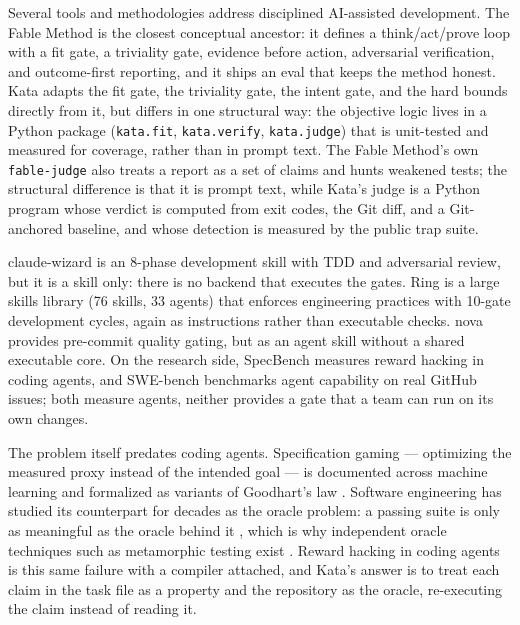 \documentclass[11pt]{article}
\begin{document}
Several tools and methodologies address disciplined AI-assisted development.
The Fable Method \cite{fable} is the closest conceptual ancestor: it defines
a think/act/prove loop with a fit gate, a triviality gate, evidence before
action, adversarial verification, and outcome-first reporting, and it ships
an eval that keeps the method honest. Kata adapts the fit gate, the
triviality gate, the intent gate, and the hard bounds directly from it, but
differs in one structural way: the objective logic lives in a Python package
(\texttt{kata.fit}, \texttt{kata.verify}, \texttt{kata.judge}) that is
unit-tested and measured for coverage, rather than in prompt text. The
Fable Method's own \texttt{fable-judge} also treats a report as a set of
claims and hunts weakened tests; the structural difference is that it is
prompt text, while Kata's judge is a Python program whose verdict is
computed from exit codes, the Git diff, and a Git-anchored baseline, and
whose detection is measured by the public trap suite.

claude-wizard \cite{claudewizard} is an 8-phase development skill with TDD
and adversarial review, but it is a skill only: there is no backend that
executes the gates. Ring \cite{ring} is a large skills library (76 skills, 33
agents) that enforces engineering practices with 10-gate development cycles,
again as instructions rather than executable checks. nova \cite{nova}
provides pre-commit quality gating, but as an agent skill without a shared
executable core. On the research
side, SpecBench \cite{specbench} measures reward hacking in coding agents, and
SWE-bench \cite{swebench} benchmarks agent capability on real GitHub issues;
both measure agents, neither provides a gate that a team can run on its own
changes.

The problem itself predates coding agents. Specification gaming ---
optimizing the measured proxy instead of the intended goal --- is
documented across machine learning \cite{krakovna, amodei-concrete} and
formalized as variants of Goodhart's law \cite{goodhart}. Software
engineering has studied its counterpart for decades as the oracle problem:
a passing suite is only as meaningful as the oracle behind it
\cite{barr-oracle}, which is why independent oracle techniques such as
metamorphic testing exist \cite{chen-metamorphic}. Reward hacking in
coding agents is this same failure with a compiler attached, and Kata's
answer is to treat each claim in the task file as a property and the
repository as the oracle, re-executing the claim instead of reading it.
\end{document}
